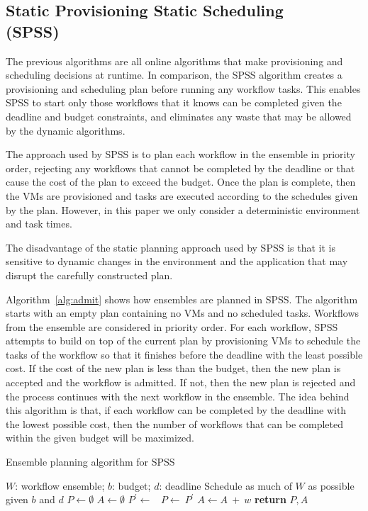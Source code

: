 \documentclass{sig-alternate}
\begin{document}
\subsection{Static Provisioning Static Scheduling \\(SPSS)}

The previous algorithms are all online algorithms that make provisioning 
and scheduling decisions at runtime. In comparison, the SPSS algorithm 
creates a provisioning and scheduling plan before running any workflow tasks.
This enables SPSS to start only those workflows that it knows can be completed
given the deadline and budget constraints, and eliminates any waste that may
be allowed by the dynamic algorithms.

The approach used by SPSS is to plan each workflow in the ensemble in priority 
order, rejecting any workflows that cannot be completed by the deadline or that 
cause the cost of the plan to exceed the budget. Once the plan is complete, then 
the VMs are provisioned and tasks are executed according to the schedules given
by the plan. However, in this paper we only consider a deterministic environment and task times.

The disadvantage of the static planning approach used by SPSS is that it is 
sensitive to dynamic changes in the environment and the application that may 
disrupt the carefully constructed plan.

Algorithm~\ref{alg:admit} shows how ensembles are planned in SPSS. The algorithm
starts with an empty plan containing no VMs and no scheduled tasks. Workflows
from the ensemble are considered in priority order. For each workflow, SPSS
attempts to build on top of the current plan by provisioning VMs to schedule 
the tasks of the workflow so that it finishes before the deadline with the least
possible cost. If the cost of the new plan is less than the budget, then the 
new plan is accepted and the workflow is admitted. If not, then the new plan is 
rejected and the process continues with the next workflow in the ensemble. The 
idea behind this algorithm is that, if each workflow can be completed by the 
deadline with the lowest possible cost, then the number of workflows that can 
be completed within the given budget will be maximized.

\begin{algorithm}[tb]
\caption{Ensemble planning algorithm for SPSS}
\label{alg:admit}
\begin{algorithmic}[1]
\Require $W$: workflow ensemble; $b$: budget; $d$: deadline
\Ensure Schedule as much of $W$ as possible given $b$ and $d$
    \State $P\gets \emptyset$ 
    \State $A\gets \emptyset$ 
        \State $P^\prime \gets$\ 
            \State $P\gets\ P^\prime$ 
            \State $A \gets A\ +\ w$ 
        \EndIf
    \EndFor
    \State \textbf{return} $P,A$
\EndProcedure
\end{algorithmic}
\end{algorithm}
\end{document}
